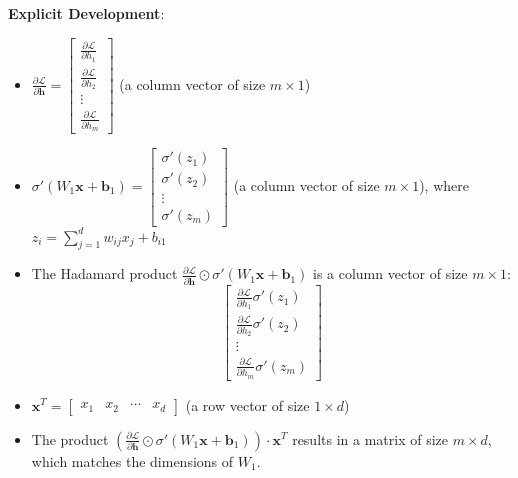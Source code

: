 \begin{notechapter}
\textbf{Explicit Development}:
\begin{itemize}
    \item \( \frac{\partial \mathcal{L}}{\partial \mathbf{h}} = \begin{bmatrix} 
    \frac{\partial \mathcal{L}}{\partial h_1} \\ \frac{\partial \mathcal{L}}{\partial h_2} \\ \vdots \\ \frac{\partial \mathcal{L}}{\partial h_m} \end{bmatrix} \) 
    (a column vector of size \( m \times 1 \))
    \item \( \sigma'(W_1 \mathbf{x} + \mathbf{b}_1) = \begin{bmatrix} \sigma'(z_1) \\ \sigma'(z_2) \\ \vdots \\ \sigma'(z_m) \end{bmatrix} \) (a column vector of size \( m \times 1 \)), where \( z_i = \sum_{j=1}^d w_{ij} x_j + b_{i1} \)
    \item The Hadamard product \( \frac{\partial \mathcal{L}}{\partial \mathbf{h}} \odot \sigma'(W_1 \mathbf{x} + \mathbf{b}_1) \) is a column vector of size \( m \times 1 \):
    \[
    \begin{bmatrix} \frac{\partial \mathcal{L}}{\partial h_1} \sigma'(z_1) \\ \frac{\partial \mathcal{L}}{\partial h_2} \sigma'(z_2) \\ \vdots \\ \frac{\partial \mathcal{L}}{\partial h_m} \sigma'(z_m) \end{bmatrix}
    \]
    \item \( \mathbf{x}^T = \begin{bmatrix} x_1 & x_2 & \cdots & x_d \end{bmatrix} \) 
    (a row vector of size \( 1 \times d \))
    \item The product \( \left( \frac{\partial \mathcal{L}}{\partial \mathbf{h}} \odot \sigma'(W_1 \mathbf{x} + \mathbf{b}_1) \right) \cdot \mathbf{x}^T \) results in a matrix of size \( m \times d \), which matches the dimensions of \( W_1 \).
\end{itemize}


\end{notechapter}
